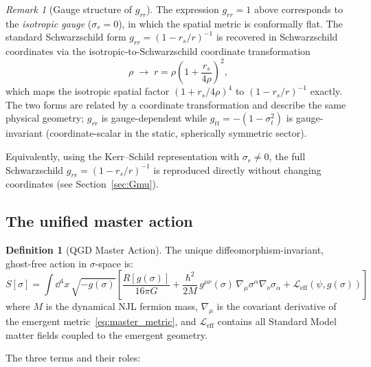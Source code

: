 \documentclass[11pt,a4paper]{article}
\theoremstyle{plain}
\theoremstyle{definition}
\newtheorem{definition}[theorem]{Definition}
\theoremstyle{remark}
\newtheorem{remark}[theorem]{Remark}
\newcommand{\sigt}{\sigma_t}
\newcommand{\rs}{r_s}
\begin{document}
\begin{remark}[Gauge structure of $g_{rr}$]
\label{rem:grr}
The expression $g_{rr} = 1$ above corresponds to the \emph{isotropic gauge}
($\sigma_r = 0$), in which the spatial metric is conformally flat.  The standard
Schwarzschild form $g_{rr} = (1-\rs/r)^{-1}$ is recovered in Schwarzschild
coordinates via the isotropic-to-Schwarzschild coordinate transformation
\begin{equation}
  \rho \;\to\; r = \rho\!\left(1 + \frac{\rs}{4\rho}\right)^{\!2},
  \label{eq:iso_to_schw}
\end{equation}
which maps the isotropic spatial factor $(1+\rs/4\rho)^4$ to $(1-\rs/r)^{-1}$
exactly.  The two forms are related by a coordinate transformation and describe
the same physical geometry; $g_{rr}$ is gauge-dependent while $g_{tt} = -(1-\sigt^2)$
is gauge-invariant (coordinate-scalar in the static, spherically symmetric sector).

Equivalently, using the Kerr--Schild representation with $\sigma_r \neq 0$, the
full Schwarzschild $g_{rr} = (1-\rs/r)^{-1}$ is reproduced directly without
changing coordinates (see Section~\ref{sec:Gmu}).
\end{remark}

\subsection{The unified master action}

\begin{definition}[QGD Master Action]
\label{def:action}
The unique diffeomorphism-invariant, ghost-free action in $\sigma$-space is:
\begin{equation}
  \boxed{S[\sigma] = \int\!\dd^4x\,\sqrt{-g(\sigma)}
    \!\left[\frac{R[g(\sigma)]}{16\pi G}
    + \frac{\hbar^2}{2M}\,g^{\mu\nu}(\sigma)\,\nabla_\mu\sigma^\alpha\nabla_\nu\sigma_\alpha
    + \mathcal{L}_{\mathrm{eff}}(\psi,g(\sigma))\right]}
  \label{eq:action}
\end{equation}
where $M$ is the dynamical NJL fermion mass, $\nabla_\mu$ is the covariant derivative
of the emergent metric~\eqref{eq:master_metric}, and $\mathcal{L}_{\mathrm{eff}}$
contains all Standard Model matter fields coupled to the emergent geometry.
\end{definition}

The three terms and their roles:
\end{document}

